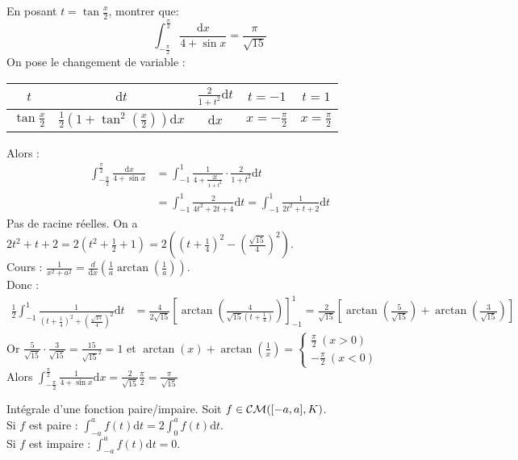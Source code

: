 \documentclass[11pt]{article}
\newcommand*{\K}{\mathbb{K}}
\newcommand*{\CM}{\mathcal{CM}}
\newcommand{\0}{\varnothing}
\newcommand{\dx}{\textrm{d}x}
\newcommand{\dt}{\textrm{d}t}
\begin{document}
\begin{ex}{}{}
    En posant $t=\tan\frac{x}{2}$, montrer que: \begin{equation*}\int_{-\frac{\pi}{2}}^{\frac{\pi}{2}}\frac{\dx}{4+\sin x}=\frac{\pi}{\sqrt{15}}\end{equation*} 
    \tcblower
    On pose le changement de variable :
    \begin{center}
        \begin{tabular}{|c|c|c|c|c|}
            \hline
            $t$ & $\dt$ & $\frac{2}{1+t^2}\dt$ & $t=-1$ & $t=1$\\
            \hline
            $\tan\frac{x}{2}$ & $\frac{1}{2}(1+\tan^2(\frac{x}{2}))\dx$ & $\dx$ & $x=-\frac{\pi}{2}$ & $x=\frac{\pi}{2}$\\
            \hline
        \end{tabular}
    \end{center}
    Alors :
    \begin{align*}
        \int_{-\frac{\pi}{2}}^{\frac{\pi}{2}}\frac{\dx}{4+\sin x}&=\int_{-1}^1\frac{1}{4+\frac{2t}{1+t^2}}\cdot\frac{2}{1+t^2}\dt\\
        &=\int_{-1}^1\frac{2}{4t^2+2t+4}\dt
        =\int_{-1}^1\frac{1}{2t^2+t+2}\dt
    \end{align*}
    Pas de racine réelles. On a $2t^2+t+2=2(t^2+\frac{1}{2}+1)=2((t+\frac{1}{4})^2-(\frac{\sqrt{15}}{4})^2)$.\\
    Cours : $\frac{1}{x^2+a^2}=\frac{d}{\dx}(\frac{1}{a}\arctan(\frac{1}{a}))$.\\
    Donc :
    \begin{align*}
        \frac{1}{2}\int_{-1}^1\frac{1}{(t+\frac{1}{4})^2+(\frac{\sqrt{15}}{4})^2}\dt &= \frac{4}{2\sqrt{15}}\left[ \arctan(\frac{4}{\sqrt{15}(t+\frac{1}{4})})\right]_{-1}^1 = \frac{2}{\sqrt{15}}\left[ \arctan(\frac{5}{\sqrt{15}}) + \arctan(\frac{3}{\sqrt{15}}) \right]
    \end{align*}
    Or $\frac{5}{\sqrt{15}}\cdot\frac{3}{\sqrt{15}}=\frac{15}{\sqrt{15}^2}=1$ et $\arctan(x)+\arctan(\frac{1}{x})=\begin{cases}\frac{\pi}{2} ~ (x>0)\\-\frac{\pi}{2} ~ (x<0) \end{cases}$\\
    Alors $\int_{-\frac{\pi}{2}}^{\frac{\pi}{2}}\frac{1}{4+\sin x}\dx=\frac{2}{\sqrt{15}}\frac{\pi}{2}=\frac{\pi}{\sqrt{15}}$
\end{ex}

\begin{corr}{Intégrale d'une fonction paire/impaire.}{}
    Soit $f\in\CM([-a,a],\\K)$.\\
    Si $f$ est paire : $\int_{-a}^af(t)\dt=2\int_0^af(t)\dt$.\\
    Si $f$ est impaire : $\int_{-a}^af(t)\dt=0$.
\end{corr}
\end{document}
